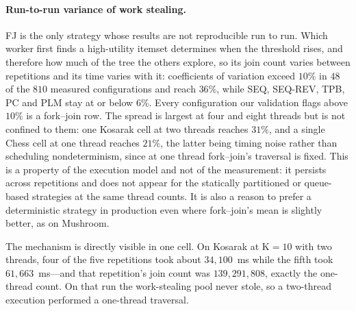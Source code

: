 \documentclass[pdflatex,sn-vancouver-num]{sn-jnl}
\theoremstyle{thmstyleone}%
\theoremstyle{thmstyletwo}%
\theoremstyle{thmstylethree}%
\newcommand{\Kk}{\mathrm{K}}
\begin{document}
\paragraph{Run-to-run variance of work stealing.}
FJ is the only strategy whose results are not reproducible run to run.
Which worker first finds a high-utility itemset determines when the
threshold rises, and therefore how much of the tree the others explore,
so its join count varies between repetitions and its time varies with it:
coefficients of variation exceed $10\%$ in $48$ of the $810$ measured
configurations and reach $36\%$, while SEQ, SEQ-REV, TPB, PC and PLM
stay at or below $6\%$. Every configuration our validation flags above
$10\%$ is a fork--join row. The spread is largest at four and eight
threads but is not confined to them: one Kosarak cell at two threads
reaches $31\%$, and a single Chess cell at one thread reaches $21\%$,
the latter being timing noise rather than scheduling nondeterminism,
since at one thread fork--join's traversal is fixed. This is a property
of the execution model and not of the measurement: it persists across
repetitions and does not appear for the statically partitioned or
queue-based strategies at the same thread counts. It is also a reason to
prefer a deterministic strategy in production even where fork--join's
mean is slightly better, as on Mushroom.

The mechanism is directly visible in one cell. On Kosarak at $\Kk=10$
with two threads, four of the five repetitions took about $34{,}100$~ms
while the fifth took $61{,}663$~ms---and that repetition's join count
was $139{,}291{,}808$, exactly the one-thread count. On that run the
work-stealing pool never stole, so a two-thread execution performed a
one-thread traversal.
 
\end{document}
